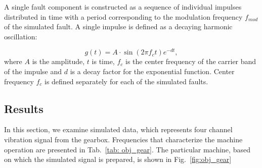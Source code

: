 \documentclass[3p,12pt]{elsarticle}
\begin{document}
A single fault component is constructed as a sequence of individual impulses distributed in time with a period corresponding to the modulation frequency $f_{mod}$ of the simulated fault. A single impulse is defined as a decaying harmonic oscillation:

\begin{equation}
    g(t)=A\cdot\sin{(2 \pi f_c t)}e^{-dt},
\end{equation}
where $A$ is the amplitude, $t$ is time, $f_c$ is the center frequency of the carrier band of the impulse and $d$ is a decay factor for the exponential function. Center frequency $f_c$ is defined separately for each of the simulated faults. 

\subsection{Results}

In this section, we examine simulated data, which represents four channel vibration signal from the gearbox. Frequencies that characterize the machine operation are presented in Tab.~\ref{tab: obj_gear}. The particular machine, based on which the simulated signal is prepared, is shown in Fig.~\ref{fig:obj_gear}
\end{document}
